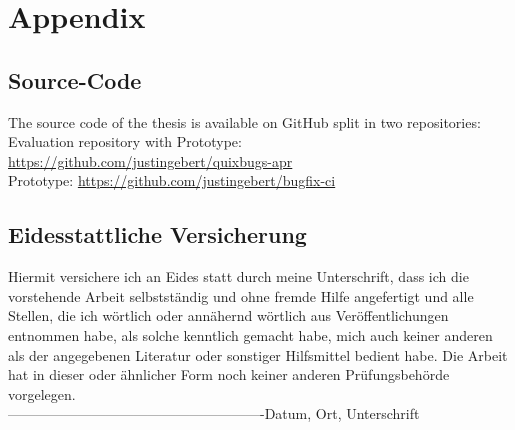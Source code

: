 \appendix

\chapter{Appendix} \label{chapter:appendix}

\section{Source-Code}
The source code of the thesis is available on GitHub split in two repositories: 
Evaluation repository with Prototype:\\
\url{https://github.com/justingebert/quixbugs-apr}\\
Prototype: \url{https://github.com/justingebert/bugfix-ci}


\newpage



\thispagestyle{empty}
\noindent


\section*{Eidesstattliche Versicherung}
Hiermit versichere ich an Eides statt durch meine Unterschrift, dass ich die vorstehende Arbeit selbstst\"andig und ohne fremde Hilfe angefertigt und alle Stellen, die ich w\"ortlich oder ann\"ahernd w\"ortlich aus Ver\"offentlichungen entnommen habe, als solche kenntlich gemacht habe, mich auch keiner anderen als der angegebenen Literatur oder sonstiger Hilfsmittel bedient habe. Die Arbeit hat in dieser oder \"ahnlicher Form noch keiner anderen Pr\"ufungsbeh\"orde vorgelegen.\\
\linebreak[4]
\linebreak[4]
\linebreak[4]
\linebreak[4]
-------------------------------------------------------\linebreak[4]
Datum, Ort, Unterschrift